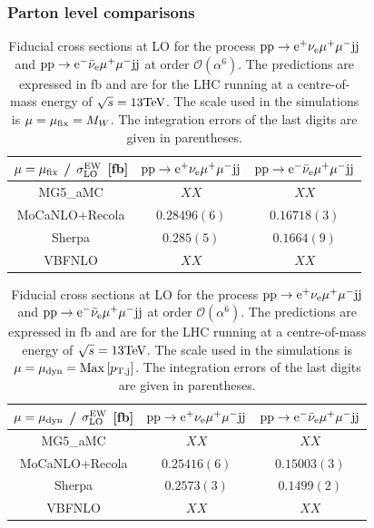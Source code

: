 \documentclass[11pt]{cernrep}
\begin{document}
\subsubsection*{Parton level comparisons}

\begin{table}
\begin{center} 
\begin{tabular}{ c | c | c }
 $\mu = \mu_{\rm fix}$ / $\sigma_{\rm LO}^{\rm EW}$ [fb] & ${\rm p} {\rm p} \to {\rm e}^+  \nu_{\rm e}  \mu^+ \mu^- {\rm j} {\rm j}$  & ${\rm p} {\rm p} \to {\rm e}^-  \bar \nu_{\rm e}  \mu^+ \mu^- {\rm j} {\rm j}$  \\
  \hline\hline
{\sc MG5\_aMC}        & $XX$  & $XX$   \\
  {\sc MoCaNLO}+{\sc Recola}             & $0.28496(6)$  & $0.16718(3)$  \\
{\sc Sherpa}        & $0.285(5)$  & $0.1664(9)$   \\
{\sc VBFNLO}        & $XX$  & $XX$   \\
  \hline
\end{tabular}
\end{center}
\caption{
Fiducial cross sections at LO for the process ${\rm p}{\rm p}\to{\rm e}^+\nu_{\rm e}\mu^+\mu^-{\rm j}{\rm j}$ and ${\rm p}{\rm p}\to{\rm e}^-\bar\nu_{\rm e}\mu^+\mu^-{\rm j}{\rm j}$ at order $\mathcal{O} (\alpha^6)$.
The predictions are expressed in fb and are for the LHC running at a centre-of-mass energy of $\sqrt{s}=13 {\rm TeV}$.
The scale used in the simulations is $\mu = \mu_{\rm fix} = M_W$.
The integration errors of the last digits are given in parentheses.}
\label{table:xsectLOfix}
\end{table}

\begin{table}
\begin{center} 
\begin{tabular}{ c | c | c }
 $\mu = \mu_{\rm dyn}$ / $\sigma_{\rm LO}^{\rm EW}$ [fb] & ${\rm p} {\rm p} \to {\rm e}^+  \nu_{\rm e}  \mu^+ \mu^- {\rm j} {\rm j}$  & ${\rm p} {\rm p} \to {\rm e}^-  \bar \nu_{\rm e}  \mu^+ \mu^- {\rm j} {\rm j}$  \\
  \hline\hline
{\sc MG5\_aMC}        & $XX$  & $XX$   \\
  {\sc MoCaNLO}+{\sc Recola}             & $0.25416(6)$  & $0.15003(3)$  \\
{\sc Sherpa}        & $0.2573(3)$  & $0.1499(2)$   \\
{\sc VBFNLO}        & $XX$  & $XX$   \\
  \hline
\end{tabular}
\end{center}
\caption{
Fiducial cross sections at LO for the process ${\rm p}{\rm p}\to{\rm e}^+\nu_{\rm e}\mu^+\mu^-{\rm j}{\rm j}$ and ${\rm p}{\rm p}\to{\rm e}^-\bar\nu_{\rm e}\mu^+\mu^-{\rm j}{\rm j}$ at order $\mathcal{O} (\alpha^6)$.
The predictions are expressed in fb and are for the LHC running at a centre-of-mass energy of $\sqrt{s}=13 {\rm TeV}$.
The scale used in the simulations is $\mu = \mu_{\rm dyn} = {\rm Max}\left[p_{\rm T, j}\right]$.
The integration errors of the last digits are given in parentheses.}
\label{table:xsectLOdyn}
\end{table}
\end{document}
